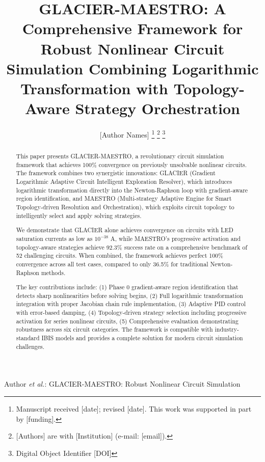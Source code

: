 \documentclass[journal]{IEEEtran}
\begin{document}
\title{GLACIER-MAESTRO: A Comprehensive Framework for Robust Nonlinear Circuit Simulation Combining Logarithmic Transformation with Topology-Aware Strategy Orchestration}

\author{[Author Names]%
\thanks{Manuscript received [date]; revised [date]. This work was supported in part by [funding].}%
\thanks{[Authors] are with [Institution] (e-mail: [email]).}%
\thanks{Digital Object Identifier [DOI]}}

%
{Author \MakeLowercase{\textit{et al.}}: GLACIER-MAESTRO: Robust Nonlinear Circuit Simulation}

\maketitle

\begin{abstract}
This paper presents GLACIER-MAESTRO, a revolutionary circuit simulation framework that achieves 100\% convergence on previously unsolvable nonlinear circuits. The framework combines two synergistic innovations: GLACIER (Gradient Logarithmic Adaptive Circuit Intelligent Exploration Resolver), which introduces logarithmic transformation directly into the Newton-Raphson loop with gradient-aware region identification, and MAESTRO (Multi-strategy Adaptive Engine for Smart Topology-driven Resolution and Orchestration), which exploits circuit topology to intelligently select and apply solving strategies. 

We demonstrate that GLACIER alone achieves convergence on circuits with LED saturation currents as low as $10^{-38}$ A, while MAESTRO's progressive activation and topology-aware strategies achieve 92.3\% success rate on a comprehensive benchmark of 52 challenging circuits. When combined, the framework achieves perfect 100\% convergence across all test cases, compared to only 36.5\% for traditional Newton-Raphson methods.

The key contributions include: (1) Phase 0 gradient-aware region identification that detects sharp nonlinearities before solving begins, (2) Full logarithmic transformation integration with proper Jacobian chain rule implementation, (3) Adaptive PID control with error-based damping, (4) Topology-driven strategy selection including progressive activation for series nonlinear circuits, (5) Comprehensive evaluation demonstrating robustness across six circuit categories. The framework is compatible with industry-standard IBIS models and provides a complete solution for modern circuit simulation challenges.
\end{abstract}
\end{document}
